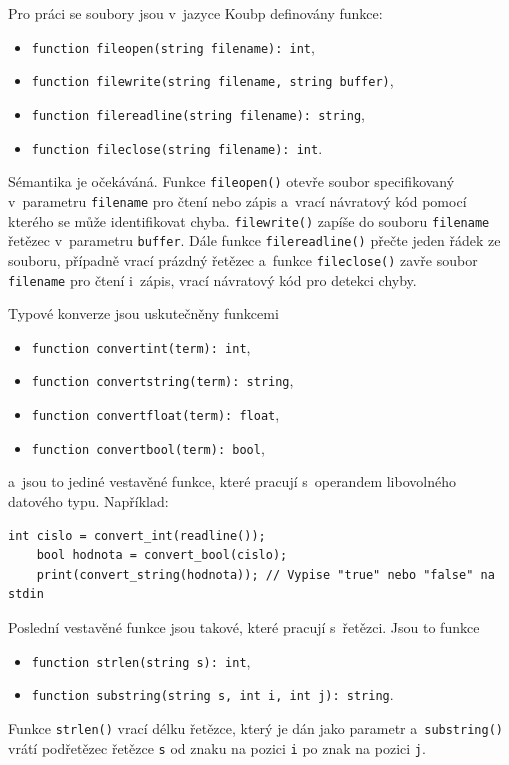 Pro práci se soubory jsou v~jazyce Koubp definovány funkce:
\begin{itemize}
    \item \texttt{function file\textunderscore open(string filename): int},
    \item \texttt{function file\textunderscore write(string filename, string buffer)},
    \item \texttt{function file\textunderscore readline(string filename): string},
    \item \texttt{function file\textunderscore close(string filename): int}.
\end{itemize}
Sémantika je očekáváná.
Funkce \texttt{file\textunderscore open()} otevře soubor specifikovaný v~parametru \texttt{filename} pro čtení nebo zápis a~vrací návratový kód pomocí kterého se může identifikovat chyba.
\texttt{file\textunderscore write()} zapíše do souboru \texttt{filename} řetězec v~parametru \texttt{buffer}.
Dále funkce \texttt{file\textunderscore readline()} přečte jeden řádek ze souboru, případně vrací prázdný řetězec a~funkce \texttt{file\textunderscore close()} zavře soubor \texttt{filename} pro čtení i~zápis, vrací návratový kód pro detekci chyby.

Typové konverze jsou uskutečněny funkcemi
\begin{itemize}
    \item \texttt{function convert\textunderscore int(term): int},
    \item \texttt{function convert\textunderscore string(term): string},
    \item \texttt{function convert\textunderscore float(term): float},
    \item \texttt{function convert\textunderscore bool(term): bool},
\end{itemize}
a~jsou to jediné vestavěné funkce, které pracují s~operandem libovolného datového typu.
Například:
\begin{lstlisting}[language=Koubp]
    int cislo = convert_int(readline());
    bool hodnota = convert_bool(cislo);
    print(convert_string(hodnota)); // Vypise "true" nebo "false" na stdin
\end{lstlisting}

Poslední vestavěné funkce jsou takové, které pracují s~řetězci.
Jsou to funkce
\begin{itemize}
    \item \texttt{function strlen(string s): int},
    \item \texttt{function substring(string s, int i, int j): string}.
\end{itemize}
Funkce \texttt{strlen()} vrací délku řetězce, který je dán jako parametr a~\texttt{substring()} vrátí podřetězec řetězce \texttt{s} od znaku na pozici \texttt{i} po znak na pozici \texttt{j}.

